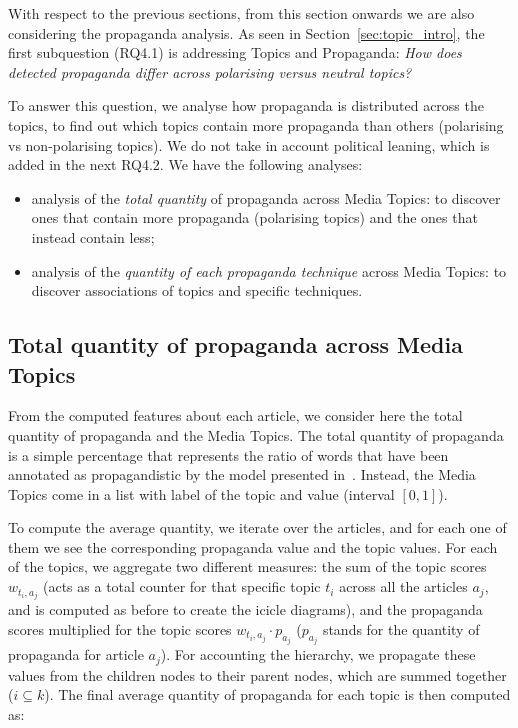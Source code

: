 With respect to the previous sections, from this section onwards we are also considering the propaganda analysis.
As seen in Section~\ref{sec:topic_intro}, the first subquestion (RQ4.1) is addressing Topics and Propaganda:
\emph{How does detected propaganda differ across polarising versus neutral topics?}

To answer this question, we analyse how propaganda is distributed across the topics, to find out which topics contain more propaganda than others (polarising vs non-polarising topics).
We do not take in account political leaning, which is added in the next RQ4.2.
We have the following analyses:

\begin{itemize}
    \item analysis of the \emph{total quantity} of propaganda across Media Topics: to discover ones that contain more propaganda (polarising topics) and the ones that instead contain less;
    \item analysis of the \emph{quantity of each propaganda technique} across Media Topics: to discover associations of topics and specific techniques.
\end{itemize}

\subsection{\statusgreen Total quantity of propaganda across Media Topics}
\label{ssec:topic_propaganda_tot}

From the computed features about each article, we consider here the total quantity of propaganda and the Media Topics.
The total quantity of propaganda is a simple percentage that represents the ratio of words that have been annotated as propagandistic by the model presented in~\citet{da2019fine}.
Instead, the Media Topics come in a list with label of the topic and value (interval $[0,1]$).

To compute the average quantity, we iterate over the articles, and for each one of them we see the corresponding propaganda value and the topic values. For each of the topics, we aggregate two different measures: the sum of the topic scores $w_{t_{i},a_{j}}$ (acts as a total counter for that specific topic $t_{i}$ across all the articles $a_{j}$, and is computed as before to create the icicle diagrams), and the propaganda scores multiplied for the topic scores $w_{t_{i},a_{j}} \cdot p_{a_{j}}$ ($p_{a_{j}}$ stands for the quantity of propaganda for article $a_{j}$).
For accounting the hierarchy, we propagate these values from the children nodes to their parent nodes, which are summed together ($i\subseteq k$).
The final average quantity of propaganda for each topic is then computed as:

